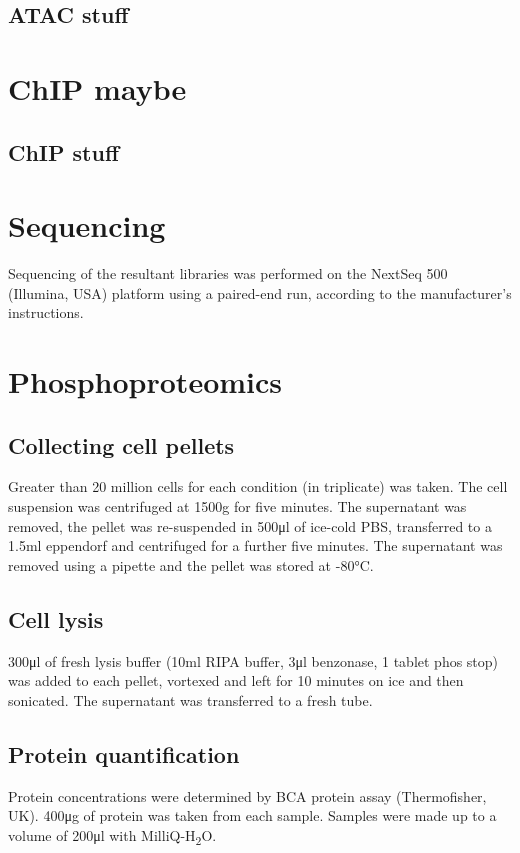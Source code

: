 \subsection{ATAC stuff}

\section{ChIP maybe}
\subsection{ChIP stuff}

\section{Sequencing}
Sequencing of the resultant libraries was performed on the NextSeq 500 (Illumina, USA) platform using a paired-end run, according to the manufacturer's instructions.

%
\section{Phosphoproteomics}\label{sec:methods-phospho}
%
\subsection{Collecting cell pellets}
Greater than 20 million cells for each condition (in triplicate) was taken.
The cell suspension was centrifuged at 1500g for five minutes.
The supernatant was removed, the pellet was re-suspended in 500\si{\ul} of ice-cold PBS, transferred to a 1.5\si{\ml} eppendorf and centrifuged for a further five minutes.
The supernatant was removed using a pipette and the pellet was stored at -80\si{\degreeCelsius}.

\subsection{Cell lysis}
300\si{\ul} of fresh lysis buffer (10\si{\ml} RIPA buffer, 3\si{\ul} benzonase, 1 tablet phos stop) was added to each pellet, vortexed and left for 10 minutes on ice and then sonicated.
The supernatant was transferred to a fresh tube.

\subsection{Protein quantification}
Protein concentrations were determined by BCA protein assay (Thermofisher, UK). 400\si{\ug} of protein was taken from each sample. Samples were made up to a volume of 200\si{\ul} with MilliQ-H\textsubscript{2}O.

